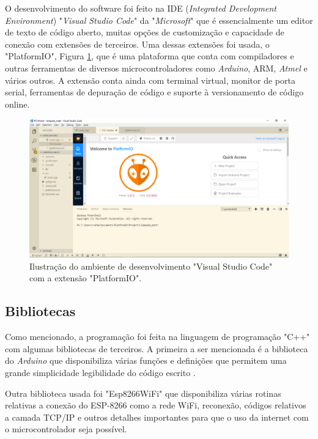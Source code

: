 O desenvolvimento do software foi feito na IDE (\textit{Integrated Development Environment}) "\textit{Visual Studio Code}" da "\textit{Microsoft}" que é essencialmente um editor de texto de código aberto, muitas opções de customização e capacidade de conexão com extensões de terceiros. Uma dessas extensões foi usada, o "PlatformIO", Figura \ref{pio}, que é uma plataforma que conta com compiladores e outras ferramentas de diversos microcontroladores como \textit{Arduino}, ARM, \textit{Atmel} e vários outros. A extensão conta ainda com terminal virtual, monitor de porta serial, ferramentas de depuração de código e suporte à versionamento de código online.

\begin{figure}[ht]
    \begin{center}
    \includegraphics[width=\textwidth]{figuras/pio.PNG}
    \end{center}
    \caption[Ilustração do Visual Studio Code com o PlatformIO.]{Ilustração do ambiente de desenvolvimento "Visual Studio Code" com a extensão "PlatformIO".}
    \label{pio}
\end{figure}

\subsection{Bibliotecas}

Como mencionado, a programação foi feita na linguagem de programação "C++" com algumas bibliotecas de terceiros. A primeira a ser mencionada é a biblioteca do \textit{Arduino} que disponibiliza várias funções e definições que permitem uma grande simplicidade legibilidade do código escrito \cite{arduino}.

Outra biblioteca usada foi "Esp8266WiFi" \cite{espwifi}que disponibiliza várias rotinas relativas a conexão do ESP-8266 como a rede WiFi, reconexão, códigos relativos a camada TCP/IP e outros detalhes importantes para que o uso da internet com o microcontrolador seja possível.

